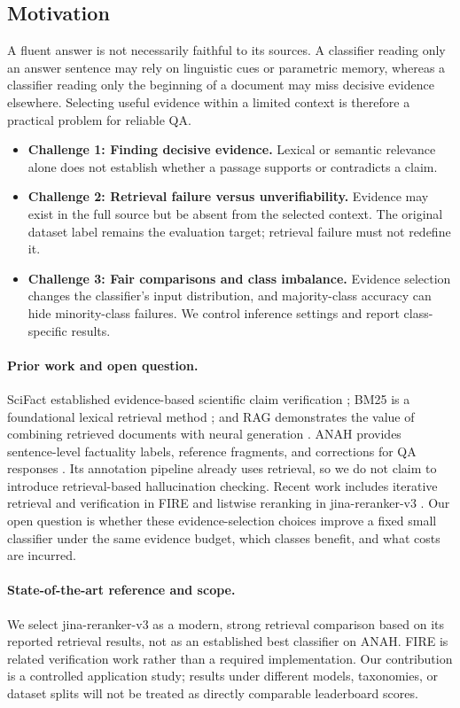 \subsection{Motivation}
A fluent answer is not necessarily faithful to its sources. A classifier reading only an answer sentence may rely on linguistic cues or parametric memory, whereas a classifier reading only the beginning of a document may miss decisive evidence elsewhere. Selecting useful evidence within a limited context is therefore a practical problem for reliable QA.
\begin{itemize}
\item \textbf{Challenge 1: Finding decisive evidence.} Lexical or semantic relevance alone does not establish whether a passage supports or contradicts a claim.
\item \textbf{Challenge 2: Retrieval failure versus unverifiability.} Evidence may exist in the full source but be absent from the selected context. The original dataset label remains the evaluation target; retrieval failure must not redefine it.
\item \textbf{Challenge 3: Fair comparisons and class imbalance.} Evidence selection changes the classifier's input distribution, and majority-class accuracy can hide minority-class failures. We control inference settings and report class-specific results.
\end{itemize}

\paragraph{Prior work and open question.}
SciFact established evidence-based scientific claim verification \citep{wadden2020}; BM25 is a foundational lexical retrieval method \citep{robertson2009}; and RAG demonstrates the value of combining retrieved documents with neural generation \citep{lewis2020}.
ANAH provides sentence-level factuality labels, reference fragments, and corrections for QA responses \citep{ji2024anah}. Its annotation pipeline already uses retrieval, so we do not claim to introduce retrieval-based hallucination checking.
Recent work includes iterative retrieval and verification in FIRE \citep{xie2025fire} and listwise reranking in jina-reranker-v3 \citep{wang2025jina}.
Our open question is whether these evidence-selection choices improve a fixed small classifier under the same evidence budget, which classes benefit, and what costs are incurred.

\paragraph{State-of-the-art reference and scope.}
We select jina-reranker-v3 as a modern, strong retrieval comparison based on its reported retrieval results, not as an established best classifier on ANAH.
FIRE is related verification work rather than a required implementation. Our contribution is a controlled application study; results under different models, taxonomies, or dataset splits will not be treated as directly comparable leaderboard scores.
